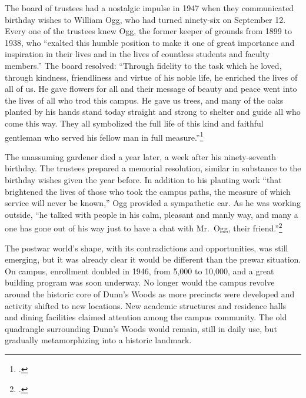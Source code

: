 \documentclass[
  american,
  letterpaper,
]{scrreprt}
\begin{document}
The board of trustees had a nostalgic impulse in 1947 when they
communicated birthday wishes to William Ogg, who had turned ninety-six
on September 12. Every one of the trustees knew Ogg, the former keeper
of grounds from 1899 to 1938, who ``exalted this humble position to make
it one of great importance and inspiration in their lives and in the
lives of countless students and faculty members.'' The board resolved:
``Through fidelity to the task which he loved, through kindness,
friendliness and virtue of his noble life, he enriched the lives of all
of us. He gave flowers for all and their message of beauty and peace
went into the lives of all who trod this campus. He gave us trees, and
many of the oaks planted by his hands stand today straight and strong to
shelter and guide all who come this way. They all symbolized the full
life of this kind and faithful gentleman who served his fellow man in
full measure.''\footnote{.}

The unassuming gardener died a year later, a week after his
ninety-seventh birthday. The trustees prepared a memorial resolution,
similar in substance to the birthday wishes given the year before. In
addition to his planting work ``that brightened the lives of those who
took the campus paths, the measure of which service will never be
known,'' Ogg provided a sympathetic ear. As he was working outside, ``he
talked with people in his calm, pleasant and manly way, and many a one
has gone out of his way just to have a chat with Mr.~Ogg, their
friend.''\footnote{.}

The postwar world's shape, with its contradictions and opportunities,
was still emerging, but it was already clear it would be different than
the prewar situation. On campus, enrollment doubled in 1946, from 5,000
to 10,000, and a great building program was soon underway. No longer
would the campus revolve around the historic core of Dunn's Woods as
more precincts were developed and activity shifted to new locations. New
academic structures and residence halls and dining facilities claimed
attention among the campus community. The old quadrangle surrounding
Dunn's Woods would remain, still in daily use, but gradually
metamorphizing into a historic landmark.
\end{document}
